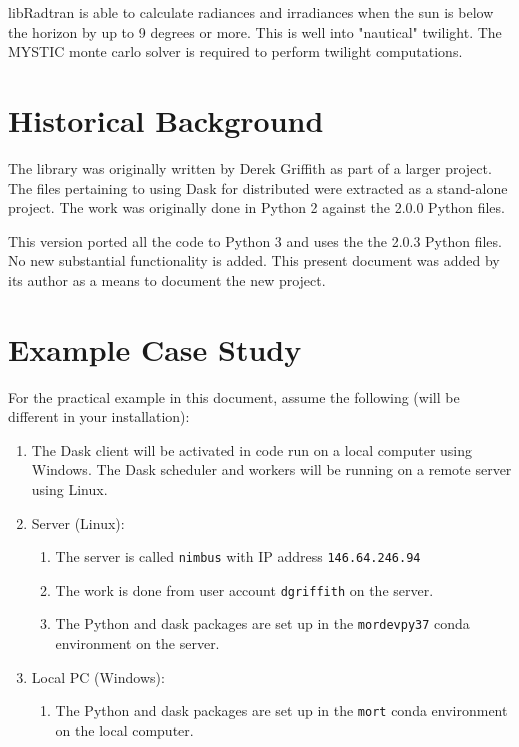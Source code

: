 libRadtran is able to calculate radiances and irradiances when the sun is below the horizon by up
to 9 degrees or more. This is well into "nautical" twilight. The MYSTIC monte carlo solver is
required to perform twilight computations.


\section{Historical Background}
The \libraddask{} library was originally written by Derek Griffith \cite{DerekJGriffithMORTICIA} as part of a larger project.  The files pertaining to using Dask for distributed \libradtran{} were extracted as a stand-alone project.  The work was originally done in Python 2 against the \libradtran{} 2.0.0 Python files.

This version ported all the code to Python 3 and uses the  the \libradtran{} 2.0.3 Python files.
No new substantial functionality is added.
This present document was added by its author as a means to document the new project.

\section{Example Case Study}

For the practical example in this document, assume the following (will be different in your installation):
\begin{enumerate}
\item The Dask client will be activated in code run on a local computer using Windows.  The Dask scheduler and workers will be running on a remote server using Linux.
\item Server (Linux):
\begin{enumerate}
\item The server is called \lstinline{nimbus} with IP address \lstinline{146.64.246.94}
\item The work is done from  user account \lstinline{dgriffith} on the server.
\item The Python and dask packages are set up in the \lstinline{mordevpy37} conda environment  on the server.
\end{enumerate}

\item Local PC (Windows):
\begin{enumerate}
\item The Python and dask packages are set up in the \lstinline{mort} conda environment  on the local computer.
\end{enumerate}

\end{enumerate}


